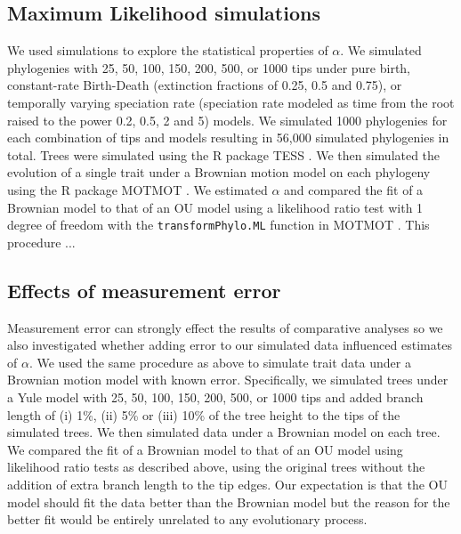 \documentclass[a4paper,12pt]{article}
\begin{document}
  \subsection{Maximum Likelihood simulations}
  \label{section:sims.methods} 
    We used simulations to explore the statistical properties of $\alpha$. 
    We simulated phylogenies with 25, 50, 100, 150, 200, 500, or 1000 tips under pure birth, constant-rate Birth-Death (extinction fractions of 0.25, 0.5 and 0.75), or temporally varying speciation rate (speciation rate modeled as time from the root raised to the power 0.2, 0.5, 2 and 5) models. 
    We simulated 1000 phylogenies for each combination of tips and models resulting in 56,000 simulated phylogenies in total. 
    Trees were simulated using the R package TESS \cite{hohna2013fast}. 
    We then simulated the evolution of a single trait under a Brownian motion model on each phylogeny using the R package MOTMOT \citep{Thomas:2011aa}. 
    We estimated $\alpha$ and compared the fit of a Brownian model to that of an OU model using a likelihood ratio test with 1 degree of freedom with the \texttt{transformPhylo.ML} function in MOTMOT \citep{Thomas:2011aa}. 
    This procedure ... %

  \subsection{Effects of measurement error}
    Measurement error can strongly effect the results of comparative analyses \cite{silvestro2015} so we also investigated whether adding error to our simulated data influenced estimates of $\alpha$.
    We used the same procedure as above to simulate trait data under a Brownian motion model with known error. 
    Specifically, we simulated trees under a Yule model with 25, 50, 100, 150, 200, 500, or 1000 tips and added branch length of (i) 1\%, (ii) 5\% or (iii) 10\% of the tree height to the tips of the simulated trees. 
    We then simulated data under a Brownian model on each tree. 
    We compared the fit of a Brownian model to that of an OU model using likelihood ratio tests as described above, using the original trees without the addition of extra branch length to the tip edges. 
    Our expectation is that the OU model should fit the data better than the Brownian model but the reason for the better fit would be entirely unrelated to any evolutionary process. 
\end{document}
